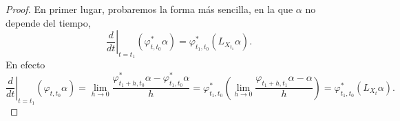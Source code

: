   \begin{proof}
    En primer lugar, probaremos la forma más sencilla, en la que $\alpha$ no depende del tiempo,
    \begin{equation*}
      \left.\frac{d}{dt}\right|_{t=t_1}(\varphi^*_{t,t_0}\alpha)=\varphi^*_{t_1,t_0}(L_{X_{t_1}}\alpha).
    \end{equation*}
    En efecto
    \begin{equation*}
      \left.\frac{d}{dt}\right|_{t=t_1}(\varphi_{t,t_0}\alpha)=\lim_{h\rightarrow 0}\frac{\varphi^*_{t_1+h,t_0}\alpha-\varphi^*_{t_1,t_0}\alpha}{h}=\varphi^*_{t_1,t_0}\left( \lim_{h\rightarrow 0 }\frac{\varphi_{t_1+h,t_1}\alpha-\alpha}{h} \right)=\varphi^*_{t_1,t_0}(L_{X_t}\alpha).
    \end{equation*}







  \end{proof}
